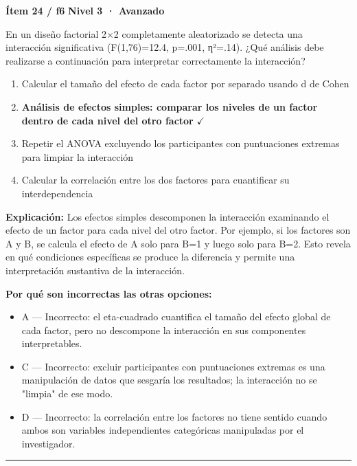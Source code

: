 \documentclass[12pt,a4paper]{article}
\begin{document}
\begin{mdframed}[backgroundcolor=fondogris,linecolor=rojo,linewidth=1pt,innerleftmargin=10pt,innerrightmargin=10pt,innertopmargin=7pt,innerbottommargin=7pt]
\textbf{Ítem 24 / f6} \hfill {\small\bfseries\color{rojo} Nivel 3 · Avanzado}
\end{mdframed}

En un diseño factorial 2×2 completamente aleatorizado se detecta una interacción significativa (F(1,76)=12.4, p=.001, η²=.14). ¿Qué análisis debe realizarse a continuación para interpretar correctamente la interacción?

\begin{enumerate}
  \item[A.] Calcular el tamaño del efecto de cada factor por separado usando d de Cohen
  \item[\textbf{\color{verde}B.}] \textbf{\color{verde} Análisis de efectos simples: comparar los niveles de un factor dentro de cada nivel del otro factor} \hfill $\checkmark$
  \item[C.] Repetir el ANOVA excluyendo los participantes con puntuaciones extremas para limpiar la interacción
  \item[D.] Calcular la correlación entre los dos factores para cuantificar su interdependencia
\end{enumerate}

\noindent\textbf{\color{azul}Explicación:} Los efectos simples descomponen la interacción examinando el efecto de un factor para cada nivel del otro factor. Por ejemplo, si los factores son A y B, se calcula el efecto de A solo para B=1 y luego solo para B=2. Esto revela en qué condiciones específicas se produce la diferencia y permite una interpretación sustantiva de la interacción.

\noindent\textbf{\color{gris}Por qué son incorrectas las otras opciones:}
\begin{itemize}
  \item {\small A — Incorrecto: el eta-cuadrado cuantifica el tamaño del efecto global de cada factor, pero no descompone la interacción en sus componentes interpretables.}
  \item {\small C — Incorrecto: excluir participantes con puntuaciones extremas es una manipulación de datos que sesgaría los resultados; la interacción no se "limpia" de ese modo.}
  \item {\small D — Incorrecto: la correlación entre los factores no tiene sentido cuando ambos son variables independientes categóricas manipuladas por el investigador.}
\end{itemize}
\vspace{8pt}\hrule\vspace{10pt}
\end{document}
